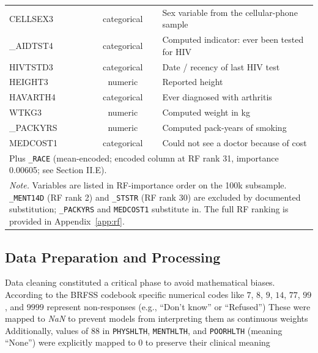 \documentclass[conference]{IEEEtran}
\begin{document}
\begin{table}[htbp]
\begin{center}
\begin{tabular}{|l|c|p{4.0cm}|}
CELLSEX3   & categorical & Sex variable from the cellular-phone sample \\
\_AIDTST4  & categorical & Computed indicator: ever been tested for HIV \\
HIVTSTD3   & categorical & Date / recency of last HIV test \\
HEIGHT3    & numeric     & Reported height \\
HAVARTH4   & categorical & Ever diagnosed with arthritis \\
WTKG3      & numeric     & Computed weight in kg \\
\_PACKYRS  & numeric     & Computed pack-years of smoking \\
MEDCOST1   & categorical & Could not see a doctor because of cost \\
\hline
\multicolumn{3}{|p{8cm}|}{\footnotesize Plus \texttt{\_RACE} (mean-encoded; encoded column at RF rank 31, importance 0.00605; see Section II.E).} \\
\hline
\multicolumn{3}{|p{8cm}|}{\footnotesize \textit{Note.} Variables are listed in RF-importance order on the 100k subsample. \texttt{\_MENT14D} (RF rank 2) and \texttt{\_STSTR} (RF rank 30) are excluded by documented substitution; \texttt{\_PACKYRS} and \texttt{MEDCOST1} substitute in. The full RF ranking is provided in Appendix~\ref{app:rf}.} \\
\hline
\end{tabular}
\label{tab_rf_importance}
\end{center}
\end{table}

\subsection{Data Preparation and Processing}
Data cleaning constituted a critical phase to avoid mathematical biases. According to the BRFSS codebook \cite{cdc2024brfss} %
specific numerical codes like $7$, $8$, $9$, $14$, $77$, $99$, and $9999$ represent non-responses (e.g., ``Don't know'' or ``Refused'') %
These were mapped to \textit{NaN} to prevent models from interpreting them as continuous weights %
Additionally, values of $88$ in \texttt{PHYSHLTH}, \texttt{MENTHLTH}, and \texttt{POORHLTH} (meaning ``None'') were explicitly mapped to $0$ to preserve their clinical meaning %
\end{document}
